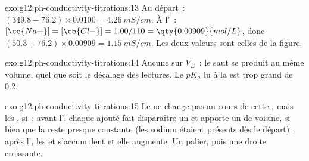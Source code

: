 \begin{solution}{exo:g12:ph-conductivity-titrations:13}
Au départ~: $(349.8 + 76.2) \times 0.0100 = \qty{4.26}{mS/cm}$. À
l'~: $[\ce{Na+}] = [\ce{Cl-}] = 1.00/110 = \qty{0.00909}{mol/L}$,
donc $(50.3 + 76.2) \times 0.00909 = \qty{1.15}{mS/cm}$. Les deux
valeurs sont celles de la figure.
\end{solution}

\begin{solution}{exo:g12:ph-conductivity-titrations:14}
Aucune sur $V_E$~: le saut se produit au même volume, quel que soit le
décalage des lectures. Le $pK_a$ lu à la  est trop
grand de 0.2.
\end{solution}

\begin{solution}{exo:g12:ph-conductivity-titrations:15}
Le  ne change pas au cours de cette , mais les , si~:
avant l', chaque   ajouté fait disparaître un 
 et apporte un 
 de  voisine, si bien que la  reste
presque constante (les  sodium étaient présents dès le départ)~;
après l', les   et 
s'accumulent et elle augmente. Un palier, puis une droite croissante.
\end{solution}

